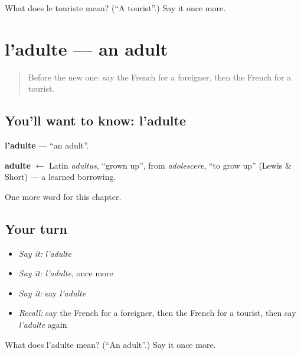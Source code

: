 \begin{tcolorbox}[breakable,colback=teal!4,colframe=teal!35!black,title={Before you move on}]
What does le touriste mean? (\textquotedblleft{}A tourist\textquotedblright{}.) Say it once more.
\end{tcolorbox}
\section[l'adulte]{l'adulte — an adult}

\label{lesson:FR-C250-adulte}



\begin{quote}
Before the new one: say the French for a foreigner, then the French for a tourist.
\end{quote}

\subsection*{You'll want to know: l'adulte}
\textbf{l'adulte} — \textquotedblleft{}an adult\textquotedblright{}.

\begin{cousinweb}
\textbf{adulte} $\leftarrow$ Latin \emph{adultus}, \textquotedblleft{}grown up\textquotedblright{}, from \emph{adolescere}, \textquotedblleft{}to grow up\textquotedblright{} (Lewis \& Short) — a learned borrowing.
\end{cousinweb}

\begin{grammarlens}[title={What you've built}]
One more word for this chapter.
\end{grammarlens}

\subsection*{Your turn}
\begin{itemize}
\raggedright
  \item \emph{Say it:} \emph{l'adulte}
  \item \emph{Say it:} \emph{l'adulte}, once more
  \item \emph{Say it:} say \emph{l'adulte}
  \item \emph{Recall:} say the French for a foreigner, then the French for a tourist, then say \emph{l'adulte} again
\end{itemize}

\begin{tcolorbox}[breakable,colback=teal!4,colframe=teal!35!black,title={Before you move on}]
What does l'adulte mean? (\textquotedblleft{}An adult\textquotedblright{}.) Say it once more.
\end{tcolorbox}
